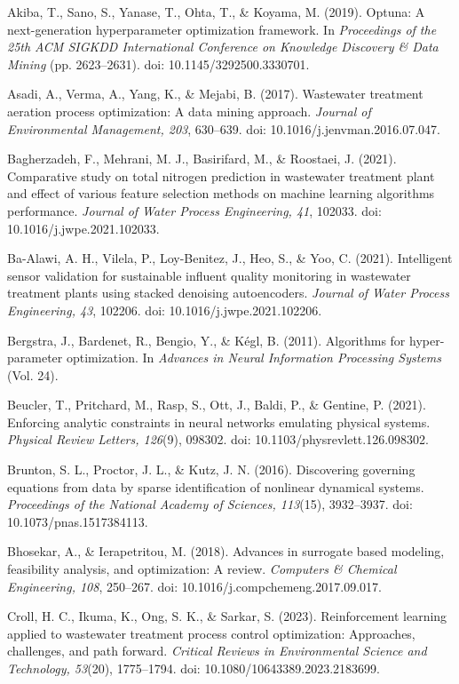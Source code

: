 \documentclass[a4paper,fleqn]{cas-sc}
\begin{document}
\noindent Akiba, T., Sano, S., Yanase, T., Ohta, T., \& Koyama, M. (2019). Optuna: A next-generation hyperparameter optimization framework. In \textit{Proceedings of the 25th ACM SIGKDD International Conference on Knowledge Discovery \& Data Mining} (pp. 2623--2631). doi: 10.1145/3292500.3330701.

\noindent Asadi, A., Verma, A., Yang, K., \& Mejabi, B. (2017). Wastewater treatment aeration process optimization: A data mining approach. \textit{Journal of Environmental Management, 203}, 630--639. doi: 10.1016/j.jenvman.2016.07.047.

\noindent Bagherzadeh, F., Mehrani, M. J., Basirifard, M., \& Roostaei, J. (2021). Comparative study on total nitrogen prediction in wastewater treatment plant and effect of various feature selection methods on machine learning algorithms performance. \textit{Journal of Water Process Engineering, 41}, 102033. doi: 10.1016/j.jwpe.2021.102033.

\noindent Ba-Alawi, A. H., Vilela, P., Loy-Benitez, J., Heo, S., \& Yoo, C. (2021). Intelligent sensor validation for sustainable influent quality monitoring in wastewater treatment plants using stacked denoising autoencoders. \textit{Journal of Water Process Engineering, 43}, 102206. doi: 10.1016/j.jwpe.2021.102206.

\noindent Bergstra, J., Bardenet, R., Bengio, Y., \& K\'egl, B. (2011). Algorithms for hyper-parameter optimization. In \textit{Advances in Neural Information Processing Systems} (Vol. 24).

\noindent Beucler, T., Pritchard, M., Rasp, S., Ott, J., Baldi, P., \& Gentine, P. (2021). Enforcing analytic constraints in neural networks emulating physical systems. \textit{Physical Review Letters, 126}(9), 098302. doi: 10.1103/physrevlett.126.098302.

\noindent Brunton, S. L., Proctor, J. L., \& Kutz, J. N. (2016). Discovering governing equations from data by sparse identification of nonlinear dynamical systems. \textit{Proceedings of the National Academy of Sciences, 113}(15), 3932--3937. doi: 10.1073/pnas.1517384113.

\noindent Bhosekar, A., \& Ierapetritou, M. (2018). Advances in surrogate based modeling, feasibility analysis, and optimization: A review. \textit{Computers \& Chemical Engineering, 108}, 250--267. doi: 10.1016/j.compchemeng.2017.09.017.

\noindent Croll, H. C., Ikuma, K., Ong, S. K., \& Sarkar, S. (2023). Reinforcement learning applied to wastewater treatment process control optimization: Approaches, challenges, and path forward. \textit{Critical Reviews in Environmental Science and Technology, 53}(20), 1775--1794. doi: 10.1080/10643389.2023.2183699.
\end{document}
